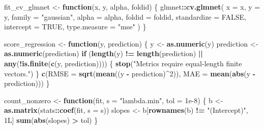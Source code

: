 \documentclass[
  11pt,
]{article}
\newenvironment{Shaded}{\begin{snugshade}}{\end{snugshade}}
\newcommand{\AttributeTok}[1]{\textcolor[rgb]{0.13,0.29,0.53}{#1}}
\newcommand{\ConstantTok}[1]{\textcolor[rgb]{0.56,0.35,0.01}{#1}}
\newcommand{\ControlFlowTok}[1]{\textcolor[rgb]{0.13,0.29,0.53}{\textbf{#1}}}
\newcommand{\DataTypeTok}[1]{\textcolor[rgb]{0.13,0.29,0.53}{#1}}
\newcommand{\DecValTok}[1]{\textcolor[rgb]{0.00,0.00,0.81}{#1}}
\newcommand{\FloatTok}[1]{\textcolor[rgb]{0.00,0.00,0.81}{#1}}
\newcommand{\FunctionTok}[1]{\textcolor[rgb]{0.13,0.29,0.53}{\textbf{#1}}}
\newcommand{\NormalTok}[1]{#1}
\newcommand{\OtherTok}[1]{\textcolor[rgb]{0.56,0.35,0.01}{#1}}
\newcommand{\SpecialCharTok}[1]{\textcolor[rgb]{0.81,0.36,0.00}{\textbf{#1}}}
\newcommand{\StringTok}[1]{\textcolor[rgb]{0.31,0.60,0.02}{#1}}
\begin{document}
\begin{Shaded}
\begin{Highlighting}[]
\NormalTok{fit\_cv\_glmnet }\OtherTok{\textless{}{-}} \ControlFlowTok{function}\NormalTok{(x, y, alpha, foldid) \{}
\NormalTok{  glmnet}\SpecialCharTok{::}\FunctionTok{cv.glmnet}\NormalTok{(}
    \AttributeTok{x =}\NormalTok{ x,}
    \AttributeTok{y =}\NormalTok{ y,}
    \AttributeTok{family =} \StringTok{"gaussian"}\NormalTok{,}
    \AttributeTok{alpha =}\NormalTok{ alpha,}
    \AttributeTok{foldid =}\NormalTok{ foldid,}
    \AttributeTok{standardize =} \ConstantTok{FALSE}\NormalTok{,}
    \AttributeTok{intercept =} \ConstantTok{TRUE}\NormalTok{,}
    \AttributeTok{type.measure =} \StringTok{"mse"}
\NormalTok{  )}
\NormalTok{\}}

\NormalTok{score\_regression }\OtherTok{\textless{}{-}} \ControlFlowTok{function}\NormalTok{(y, prediction) \{}
\NormalTok{  y }\OtherTok{\textless{}{-}} \FunctionTok{as.numeric}\NormalTok{(y)}
\NormalTok{  prediction }\OtherTok{\textless{}{-}} \FunctionTok{as.numeric}\NormalTok{(prediction)}
  \ControlFlowTok{if}\NormalTok{ (}\FunctionTok{length}\NormalTok{(y) }\SpecialCharTok{!=} \FunctionTok{length}\NormalTok{(prediction) }\SpecialCharTok{||} \FunctionTok{any}\NormalTok{(}\SpecialCharTok{!}\FunctionTok{is.finite}\NormalTok{(}\FunctionTok{c}\NormalTok{(y, prediction)))) \{}
    \FunctionTok{stop}\NormalTok{(}\StringTok{"Metrics require equal{-}length finite vectors."}\NormalTok{)}
\NormalTok{  \}}
  \FunctionTok{c}\NormalTok{(}\AttributeTok{RMSE =} \FunctionTok{sqrt}\NormalTok{(}\FunctionTok{mean}\NormalTok{((y }\SpecialCharTok{{-}}\NormalTok{ prediction)}\SpecialCharTok{\^{}}\DecValTok{2}\NormalTok{)),}
    \AttributeTok{MAE =} \FunctionTok{mean}\NormalTok{(}\FunctionTok{abs}\NormalTok{(y }\SpecialCharTok{{-}}\NormalTok{ prediction)))}
\NormalTok{\}}

\NormalTok{count\_nonzero }\OtherTok{\textless{}{-}} \ControlFlowTok{function}\NormalTok{(fit, }\AttributeTok{s =} \StringTok{"lambda.min"}\NormalTok{, }\AttributeTok{tol =} \FloatTok{1e{-}8}\NormalTok{) \{}
\NormalTok{  b }\OtherTok{\textless{}{-}} \FunctionTok{as.matrix}\NormalTok{(stats}\SpecialCharTok{::}\FunctionTok{coef}\NormalTok{(fit, }\AttributeTok{s =}\NormalTok{ s))}
\NormalTok{  slopes }\OtherTok{\textless{}{-}}\NormalTok{ b[}\FunctionTok{rownames}\NormalTok{(b) }\SpecialCharTok{!=} \StringTok{"(Intercept)"}\NormalTok{, }\DecValTok{1}\DataTypeTok{L}\NormalTok{]}
  \FunctionTok{sum}\NormalTok{(}\FunctionTok{abs}\NormalTok{(slopes) }\SpecialCharTok{\textgreater{}}\NormalTok{ tol)}
\NormalTok{\}}


\end{Highlighting}
\end{Shaded}
\end{document}
